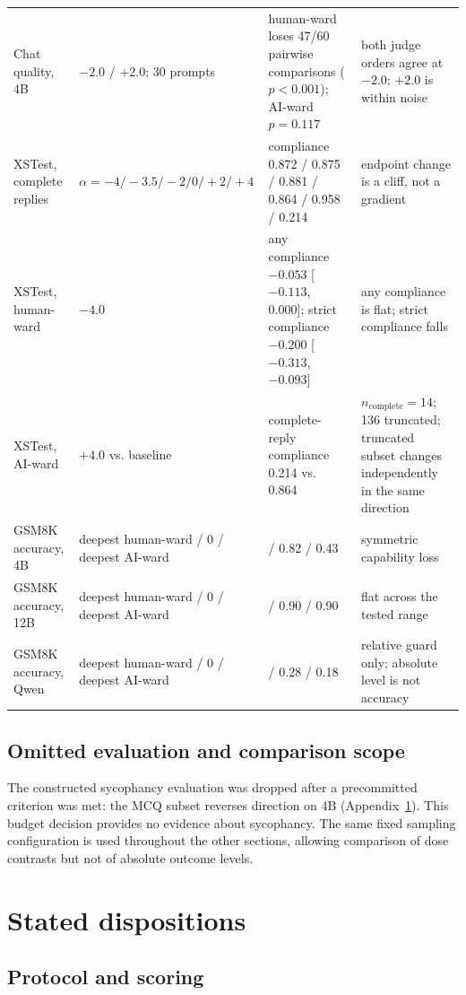 \begin{table}[!ht]
\begin{tabular}{@{}>{\raggedright\arraybackslash}p{0.85in}>{\raggedright\arraybackslash}p{1.0in}>{\raggedright\arraybackslash}p{2.1in}>{\raggedright\arraybackslash}p{1.15in}@{}}
\midrule
Chat quality, 4B & $-2.0$ / $+2.0$; 30 prompts & human-ward loses 47/60 pairwise comparisons ($p<0.001$); AI-ward $p=0.117$ & both judge orders agree at $-2.0$; $+2.0$ is within noise \\
XSTest, complete replies & $\alpha=-4/-3.5/-2/0/+2/+4$ & compliance 0.872 / 0.875 / 0.881 / 0.864 / 0.958 / 0.214 & endpoint change is a cliff, not a gradient \\
XSTest, human-ward & $-4.0$ & any compliance $-0.053$ [$-0.113$, 0.000]; strict compliance $-0.200$ [$-0.313$, $-0.093$] & any compliance is flat; strict compliance falls \\
XSTest, AI-ward & $+4.0$ vs. baseline & complete-reply compliance 0.214 vs. 0.864 & $n_{\mathrm{complete}}=14$; 136 truncated; truncated subset changes independently in the same direction \\
GSM8K accuracy, 4B & deepest human-ward / 0 / deepest AI-ward & 0.32 / 0.82 / 0.43 & symmetric capability loss \\
GSM8K accuracy, 12B & deepest human-ward / 0 / deepest AI-ward & 0.88 / 0.90 / 0.90 & flat across the tested range \\
GSM8K accuracy, Qwen & deepest human-ward / 0 / deepest AI-ward & 0.24 / 0.28 / 0.18 & relative guard only; absolute level is not accuracy \\
\bottomrule
\end{tabular}
\end{table}

\subsection{Omitted evaluation and comparison scope}

The constructed sycophancy evaluation was dropped after a precommitted
criterion was met: the MCQ subset reverses direction on 4B
(Appendix~\ref{app:mcq}). This budget decision provides no evidence about
sycophancy. The same fixed sampling configuration is used throughout the other
sections, allowing comparison of dose contrasts but not of absolute outcome
levels.

\FloatBarrier

\section{Stated dispositions}
\label{app:mcq}

\subsection{Protocol and scoring}

